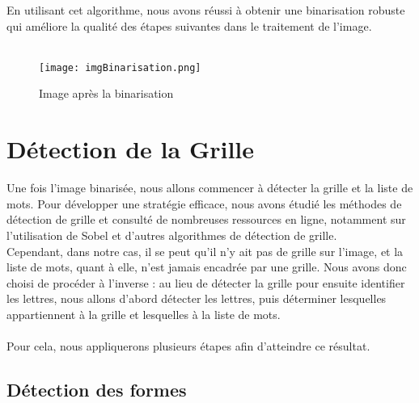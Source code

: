 \documentclass{article}
\begin{document}
En utilisant cet algorithme, nous avons réussi à obtenir une binarisation robuste qui améliore la qualité des étapes suivantes dans le traitement de l'image.
\\\\
\begin{figure}[H]
    \centering
    \texttt{[image: imgBinarisation.png]}
    \caption{Image après la binarisation}
\end{figure}

\section{Détection de la Grille}

Une fois l'image binarisée, nous allons commencer à détecter la grille et la liste de mots. Pour développer une stratégie efficace, nous avons étudié les méthodes de détection de grille et consulté de nombreuses ressources en ligne, notamment sur l'utilisation de Sobel et d'autres algorithmes de détection de grille. 
\\
Cependant, dans notre cas, il se peut qu'il n'y ait pas de grille sur l'image, et la liste de mots, quant à elle, n'est jamais encadrée par une grille. Nous avons donc choisi de procéder à l'inverse : au lieu de détecter la grille pour ensuite identifier les lettres, nous allons d'abord détecter les lettres, puis déterminer lesquelles appartiennent à la grille et lesquelles à la liste de mots. 
\\\\
Pour cela, nous appliquerons plusieurs étapes afin d'atteindre ce résultat.

\subsection{Détection des formes}
\end{document}
